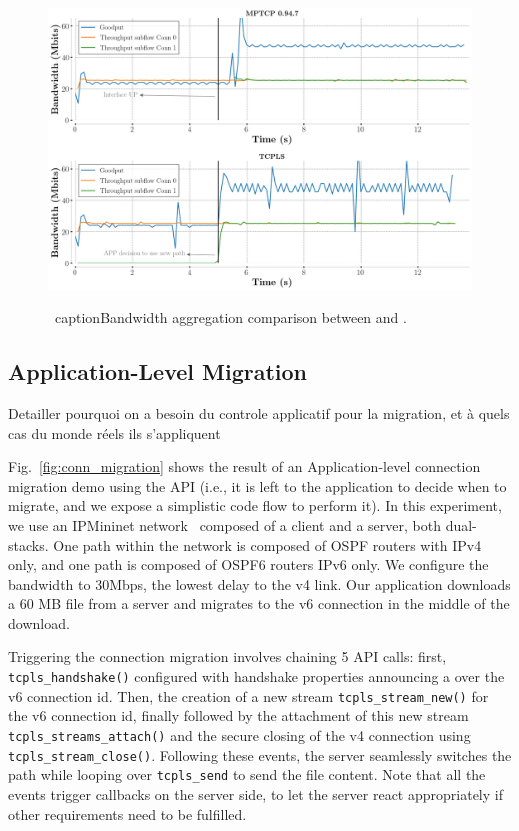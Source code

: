 \begin{figure}[!t]
  \begin{center}
    \includegraphics[width=\columnwidth]{figures/aggregate_dual.png}
  \end{center} \
  caption{Bandwidth aggregation comparison between \mptcp and
    \tcpls.}
\end{figure}

\subsection{Application-Level Migration}


Detailler pourquoi on a besoin du controle applicatif pour la migration, et à
quels cas du monde réels ils s'appliquent


Fig.~\ref{fig:conn_migration} shows the result of an Application-level
connection migration demo using the API (i.e., it is left to the
application to decide when to migrate, and we expose a simplistic code flow to
perform it). In this experiment, we use an IPMininet network~\cite{ipmininet, jadin2020educational} 
composed of a client and a server, both dual-stacks. One path within the
network is composed of OSPF routers with IPv4 only, and one path is composed of
OSPF6 routers IPv6 only. We configure the bandwidth to 30Mbps, the lowest delay
to the v4 link. Our application downloads a 60 MB file from a server and migrates to the v6 connection in the middle of the download.

Triggering the connection migration involves chaining 5 API calls:
first, \texttt{tcpls\_handshake()} configured with handshake properties announcing a \join over the v6 connection id. Then, the creation of a new stream
\texttt{tcpls\_stream\_new()} for the v6 connection id, finally followed by the attachment of this new stream \texttt{tcpls\_streams\_attach()} and the secure closing of the v4 \tcp connection using \texttt{tcpls\_stream\_close()}. Following these events, the server seamlessly switches the path while looping over \texttt{tcpls\_send} to send the file content. Note that all the events trigger callbacks on the server side, to let the server react appropriately if other requirements need to be fulfilled.

